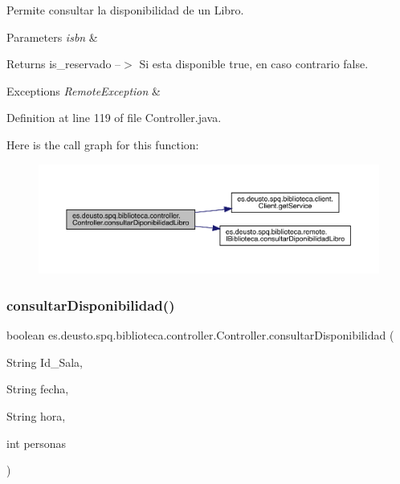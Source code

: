 Permite consultar la disponibilidad de un Libro. 
\begin{DoxyParams}{Parameters}
{\em isbn} & \\
\hline
\end{DoxyParams}
\begin{DoxyReturn}{Returns}
is\+\_\+reservado --$>$ Si esta disponible true, en caso contrario false. 
\end{DoxyReturn}

\begin{DoxyExceptions}{Exceptions}
{\em Remote\+Exception} & \\
\hline
\end{DoxyExceptions}


Definition at line 119 of file Controller.\+java.

Here is the call graph for this function\+:
\nopagebreak
\begin{figure}[H]
\begin{center}
\leavevmode
\includegraphics[width=350pt]{classes_1_1deusto_1_1spq_1_1biblioteca_1_1controller_1_1_controller_a56b80d08fca56676988e71f3abac0372_cgraph}
\end{center}
\end{figure}
\mbox{\label{classes_1_1deusto_1_1spq_1_1biblioteca_1_1controller_1_1_controller_a8817268109280bd67ae41b802e650614}} 
\subsubsection{\texorpdfstring{consultar\+Disponibilidad()}{consultarDisponibilidad()}}
{\footnotesize\ttfamily boolean es.\+deusto.\+spq.\+biblioteca.\+controller.\+Controller.\+consultar\+Disponibilidad (\begin{DoxyParamCaption}\item[{String}]{Id\+\_\+\+Sala,  }\item[{String}]{fecha,  }\item[{String}]{hora,  }\item[{int}]{personas }\end{DoxyParamCaption})}

